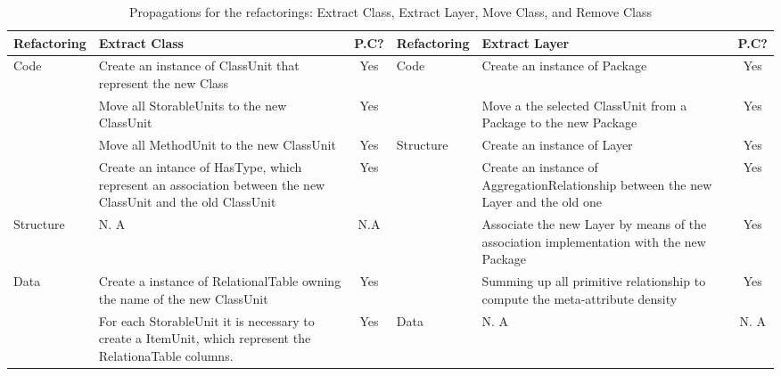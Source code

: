 \begin{table*}
\centering
\caption{Propagations for the refactorings: Extract Class, Extract Layer, Move Class, and Remove Class\label{tab:prop}}
{\footnotesize{}}%
\setlength{\tabcolsep}{0.0em}
{\renewcommand{\arraystretch}{0.5}
\begin{tabular}{|l|>{\raggedright}p{7cm}|c|l|>{\raggedright}p{7cm}|c|}
\hline 
\textbf{\footnotesize{\cellcolor{gray!40}Refactoring}} & \textbf{\footnotesize{\cellcolor{gray!40}Extract Class}} & \textbf{\footnotesize{\cellcolor{gray!40}P.C?}} & \textbf{\footnotesize{\cellcolor{gray!40}Refactoring}} & \textbf{\footnotesize{\cellcolor{gray!40}Extract Layer}} & \textbf{\footnotesize{\cellcolor{gray!40}P.C?}}\tabularnewline
\hline 
\hline 
\multirow{4}{*}{{\footnotesize{Code}}} & {\footnotesize{Create an instance of ClassUnit that represent the
new Class}} & {\footnotesize{Yes}} & \multirow{2}{*}{{\footnotesize{Code}}} & {\footnotesize{Create an instance of Package}} & {\footnotesize{Yes}}\tabularnewline
\cline{2-3} \cline{5-6} 
 & {\footnotesize{Move all StorableUnits to the new ClassUnit}} & {\footnotesize{Yes}} &  & {\footnotesize{Move a the selected ClassUnit from a Package to the
new Package}} & {\footnotesize{Yes}}\tabularnewline
\cline{2-6} 
 & {\footnotesize{Move all MethodUnit to the new ClassUnit}} & {\footnotesize{Yes}} & \multirow{4}{*}{{\footnotesize{Structure}}} & {\footnotesize{Create an instance of Layer}} & {\footnotesize{Yes}}\tabularnewline
\cline{2-3} \cline{5-6} 
 & {\footnotesize{Create an intance of HasType, which represent an association
between the new ClassUnit and the old ClassUnit}} & {\footnotesize{Yes}} &  & {\footnotesize{Create an instance of AggregationRelationship between
the new Layer and the old one}} & {\footnotesize{Yes}}\tabularnewline
\cline{1-3} \cline{5-6} 
{\footnotesize{Structure }} & {\footnotesize{N. A}} & {\footnotesize{N.A}} &  & {\footnotesize{Associate the new Layer by means of the association
implementation with the new Package}} & {\footnotesize{Yes}}\tabularnewline
\cline{1-3} \cline{5-6} 
\multirow{3}{*}{{\footnotesize{Data }}} & {\footnotesize{Create a instance of RelationalTable owning the name
of the new ClassUnit}} & {\footnotesize{Yes}} &  & {\footnotesize{Summing up all primitive relationship to compute the
meta-attribute density}} & {\footnotesize{Yes}}\tabularnewline
\cline{2-6} 
 & {\footnotesize{For each StorableUnit it is necessary to create a ItemUnit,
which represent the RelationaTable columns.}} & {\footnotesize{Yes}} & {\footnotesize{Data}} & {\footnotesize{N. A}} & {\footnotesize{N. A}}\tabularnewline

\end{tabular}}
\end{table*}
